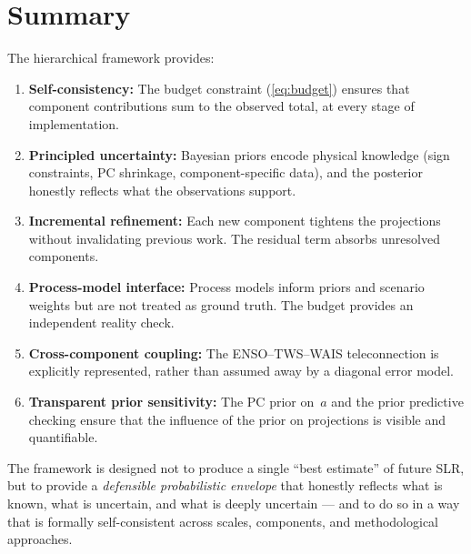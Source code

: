 \documentclass[11pt]{article}
\begin{document}
\section{Summary}
\label{sec:summary}

The hierarchical framework provides:

\begin{enumerate}
  \item \textbf{Self-consistency:} The budget constraint (\cref{eq:budget}) ensures that component contributions sum to the observed total, at every stage of implementation.

  \item \textbf{Principled uncertainty:} Bayesian priors encode physical knowledge (sign constraints, PC shrinkage, component-specific data), and the posterior honestly reflects what the observations support.

  \item \textbf{Incremental refinement:} Each new component tightens the projections without invalidating previous work.  The residual term absorbs unresolved components.

  \item \textbf{Process-model interface:} Process models inform priors and scenario weights but are not treated as ground truth.  The budget provides an independent reality check.

  \item \textbf{Cross-component coupling:} The ENSO--TWS--WAIS teleconnection is explicitly represented, rather than assumed away by a diagonal error model.

  \item \textbf{Transparent prior sensitivity:} The PC prior on~$a$ and the prior predictive checking ensure that the influence of the prior on projections is visible and quantifiable.
\end{enumerate}

The framework is designed not to produce a single ``best estimate'' of future SLR, but to provide a \emph{defensible probabilistic envelope} that honestly reflects what is known, what is uncertain, and what is deeply uncertain --- and to do so in a way that is formally self-consistent across scales, components, and methodological approaches.



\end{document}
